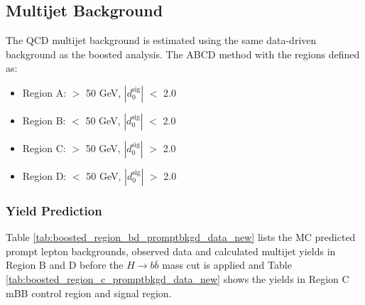 \subsection{Multijet Background}
The QCD multijet background is estimated using the same data-driven background as the boosted analysis. The ABCD method with the regions defined as:
\begin{itemize}
\item Region A: \met $>$ 50 GeV, $|d_{0}^{\textrm{sig}}|$ $<$ 2.0
\item Region B: \met $<$ 50 GeV, $|d_{0}^{\textrm{sig}}|$ $<$ 2.0
\item Region C: \met $>$ 50 GeV, $|d_{0}^{\textrm{sig}}|$ $>$ 2.0
\item Region D: \met $<$ 50 GeV, $|d_{0}^{\textrm{sig}}|$ $>$ 2.0
\end{itemize}

\subsubsection{Yield Prediction}
Table \ref{tab:boosted_region_bd_promptbkgd_data_new} lists the MC predicted prompt lepton backgrounds, observed data and calculated multijet yields in Region B and D before the ${H\rightarrow b\overline{b}}$ mass cut is applied and Table \ref{tab:boosted_region_c_promptbkgd_data_new} shows the yields in Region C mBB control region and signal region.

